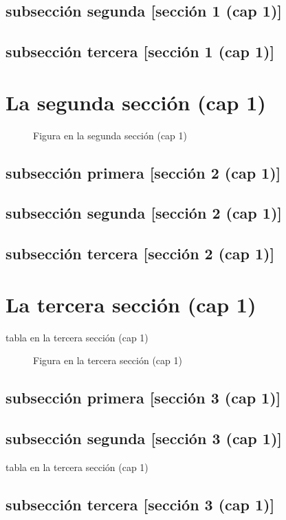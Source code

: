 \documentclass[12pt,a4paper]{report}
\begin{document}
\subsection{subsección segunda [sección 1 (cap 1)]}
\subsection{subsección tercera [sección 1 (cap 1)]}
\section{La segunda sección (cap 1)}
\begin{figure}[H]
\caption{Figura en la segunda sección (cap 1)}
\end{figure}
\subsection{subsección primera [sección 2 (cap 1)]}
\subsection{subsección segunda [sección 2 (cap 1)]}
\subsection{subsección tercera [sección 2 (cap 1)]}
\section{La tercera sección (cap 1)}
\begin{table}[H]
\caption{tabla en la tercera sección (cap 1)}
\end{table}
\begin{figure}[H]
\caption{Figura en la tercera sección (cap 1)}
\end{figure}
\subsection{subsección primera [sección 3 (cap 1)]}
\subsection{subsección segunda [sección 3 (cap 1)]}
\begin{table}[H]
\caption{tabla en la tercera sección (cap 1)}
\end{table}
\subsection{subsección tercera [sección 3 (cap 1)]}
\end{document}
